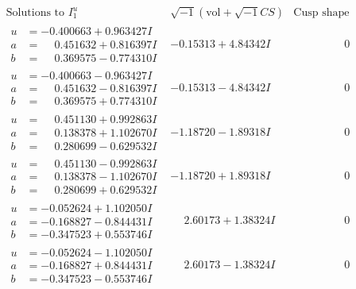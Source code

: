 \documentclass[1p]{elsarticle_modified}
\theoremstyle{definition}
\newcommand{\I}{\sqrt{-1}}
\begin{document}
$$\begin{array}{c|c|c}  
\text{Solutions to }I^u_{1}& \I (\text{vol} + \sqrt{-1}CS) & \text{Cusp shape}\\
 \hline 
\begin{aligned}
u &= -0.400663 + 0.963427 I \\
a &= \phantom{-}0.451632 + 0.816397 I \\
b &= \phantom{-}0.369575 - 0.774310 I\end{aligned}
 & -0.15313 + 4.84342 I & \phantom{-0.000000 } 0 \\ \hline\begin{aligned}
u &= -0.400663 - 0.963427 I \\
a &= \phantom{-}0.451632 - 0.816397 I \\
b &= \phantom{-}0.369575 + 0.774310 I\end{aligned}
 & -0.15313 - 4.84342 I & \phantom{-0.000000 } 0 \\ \hline\begin{aligned}
u &= \phantom{-}0.451130 + 0.992863 I \\
a &= \phantom{-}0.138378 + 1.102670 I \\
b &= \phantom{-}0.280699 - 0.629532 I\end{aligned}
 & -1.18720 - 1.89318 I & \phantom{-0.000000 } 0 \\ \hline\begin{aligned}
u &= \phantom{-}0.451130 - 0.992863 I \\
a &= \phantom{-}0.138378 - 1.102670 I \\
b &= \phantom{-}0.280699 + 0.629532 I\end{aligned}
 & -1.18720 + 1.89318 I & \phantom{-0.000000 } 0 \\ \hline\begin{aligned}
u &= -0.052624 + 1.102050 I \\
a &= -0.168827 - 0.844431 I \\
b &= -0.347523 + 0.553746 I\end{aligned}
 & \phantom{-}2.60173 + 1.38324 I & \phantom{-0.000000 } 0 \\ \hline\begin{aligned}
u &= -0.052624 - 1.102050 I \\
a &= -0.168827 + 0.844431 I \\
b &= -0.347523 - 0.553746 I\end{aligned}
 & \phantom{-}2.60173 - 1.38324 I & \phantom{-0.000000 } 0 \\ \hline\begin{aligned}

\end{aligned}
\end{array}$$
\end{document}
